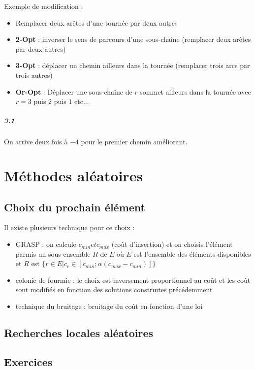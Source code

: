 \documentclass[11pt,a4paper]{report}
\begin{document}
Exemple de modification :
\begin{itemize}
    \item Remplacer deux arêtes d'une tournée par deux autres
    \item \textbf{2-Opt} : inverser le sens de parcours d'une sous-chaîne (remplacer deux arêtes par deux autres)
    \item \textbf{3-Opt} : déplacer un chemin ailleurs dans la tournée (remplacer trois arcs par trois autres)
    \item \textbf{Or-Opt} : Déplacer une sous-chaîne de $r$ sommet ailleurs dans la tournée avec $r = 3$ puis $2$ puis $1$ etc...
\end{itemize}

\paragraph*{3.1} On arrive deux fois à $-4$ pour le premier chemin améliorant.

\chapter{Méthodes aléatoires}

\section{Choix du prochain élément}

Il existe plusieurs technique pour ce choix :
\begin{itemize}
    \item GRASP : on calcule $c_{min} et c_{max}$ (coût d'insertion) et on choisis l'élément parmis un sous-ensemble $R$ de $E$ où $E$ est l'ensemble des éléments disponibles et $R$ est $\{r \in E | c_{r} \in [c_{min};\alpha(c_{max}-c_{min})]\}$
    \item colonie de fourmie : le choix est inversement proportionnel au coût et les coût sont modifiés en fonction des solutions construites précédemment
    \item technique du bruitage : bruitage du coût en fonction d'une loi
\end{itemize}

\section{Recherches locales aléatoires}

\section{Exercices}
\end{document}
